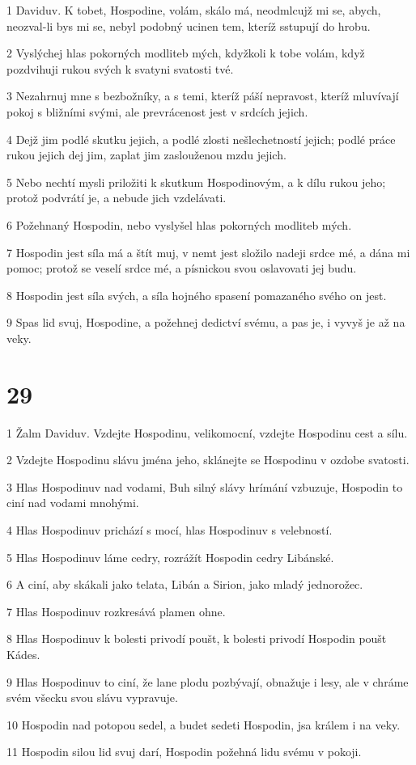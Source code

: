 \par 1 Daviduv. K tobet, Hospodine, volám, skálo má, neodmlcujž mi se, abych, neozval-li bys mi se, nebyl podobný ucinen tem, kteríž sstupují do hrobu.
\par 2 Vyslýchej hlas pokorných modliteb mých, kdyžkoli k tobe volám, když pozdvihuji rukou svých k svatyni svatosti tvé.
\par 3 Nezahrnuj mne s bezbožníky, a s temi, kteríž páší nepravost, kteríž mluvívají pokoj s bližními svými, ale prevrácenost jest v srdcích jejich.
\par 4 Dejž jim podlé skutku jejich, a podlé zlosti nešlechetností jejich; podlé práce rukou jejich dej jim, zaplat jim zaslouženou mzdu jejich.
\par 5 Nebo nechtí mysli priložiti k skutkum Hospodinovým, a k dílu rukou jeho; protož podvrátí je, a nebude jich vzdelávati.
\par 6 Požehnaný Hospodin, nebo vyslyšel hlas pokorných modliteb mých.
\par 7 Hospodin jest síla má a štít muj, v nemt jest složilo nadeji srdce mé, a dána mi pomoc; protož se veselí srdce mé, a písnickou svou oslavovati jej budu.
\par 8 Hospodin jest síla svých, a síla hojného spasení pomazaného svého on jest.
\par 9 Spas lid svuj, Hospodine, a požehnej dedictví svému, a pas je, i vyvyš je až na veky.

\chapter{29}

\par 1 Žalm Daviduv. Vzdejte Hospodinu, velikomocní, vzdejte Hospodinu cest a sílu.
\par 2 Vzdejte Hospodinu slávu jména jeho, sklánejte se Hospodinu v ozdobe svatosti.
\par 3 Hlas Hospodinuv nad vodami, Buh silný slávy hrímání vzbuzuje, Hospodin to ciní nad vodami mnohými.
\par 4 Hlas Hospodinuv prichází s mocí, hlas Hospodinuv s velebností.
\par 5 Hlas Hospodinuv láme cedry, rozrážít Hospodin cedry Libánské.
\par 6 A ciní, aby skákali jako telata, Libán a Sirion, jako mladý jednorožec.
\par 7 Hlas Hospodinuv rozkresává plamen ohne.
\par 8 Hlas Hospodinuv k bolesti privodí poušt, k bolesti privodí Hospodin poušt Kádes.
\par 9 Hlas Hospodinuv to ciní, že lane plodu pozbývají, obnažuje i lesy, ale v chráme svém všecku svou slávu vypravuje.
\par 10 Hospodin nad potopou sedel, a budet sedeti Hospodin, jsa králem i na veky.
\par 11 Hospodin silou lid svuj darí, Hospodin požehná lidu svému v pokoji.

